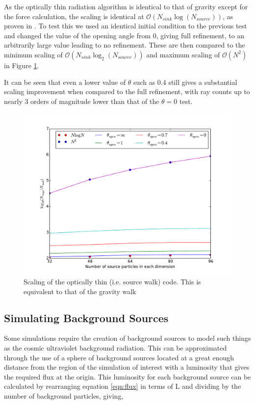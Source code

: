 As the optically thin radiation algorithm is identical to that of gravity except for the force calculation, the scaling is identical at $\mathcal{O}(N_{sink} \log(N_{source}))$, as proven in \citet{grond}. To test this we used an identical initial condition to the previous test and changed the value of the opening angle from 0, giving full refinement, to an arbitrarily large value leading to no refinement. These are then compared to the minimum scaling of $\mathcal{O}(N_{sink} \log_2(N_{source}))$ and maximum scaling of $\mathcal{O}(N^2)$ in Figure \ref{fig:scalingThin}.

It can be seen that even a lower value of $\theta$ such as 0.4 still gives a substantial scaling improvement when compared to the full refinement, with ray counts up to nearly 3 orders of magnitude lower than that of the $\theta = 0$ test.
\begin{figure} [H]
    \centering
    \includegraphics[width=\textwidth]{plots/CH4/scalingThin.pdf}
    \caption{Scaling of the optically thin (i.e. source walk) code. This is equivalent to that of the gravity walk}
    \label{fig:scalingThin}
\end{figure}
\subsection{Simulating Background Sources}

Some simulations require the creation of background sources to model such things as the cosmic ultraviolet background radiation. This can be approximated through the use of a sphere of background sources located at a great enough distance from the region of the simulation of interest with a luminosity that gives the required flux at the origin. This luminosity for each background source can be calculated by rearranging equation \ref{eqn:flux} in terms of L and dividing by the number of background particles, giving,


